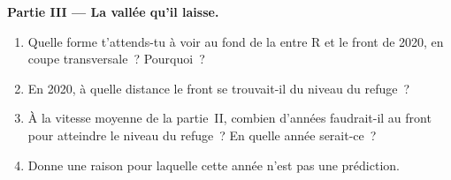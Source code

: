 \begin{problem}
\noindent\textbf{Partie III --- La vallée qu'il laisse.}\par\nopagebreak
\begin{enumerate}[resume, beginpenalty=10000]
  \item Quelle forme t'attends-tu à voir au fond de la  entre R et
        le front de 2020, en coupe transversale~? Pourquoi~?
  \item En 2020, à quelle distance le front se trouvait-il du niveau du
        refuge~?
  \item À la vitesse moyenne de la partie~II, combien d'années faudrait-il
        au front pour atteindre le niveau du refuge~? En quelle année
        serait-ce~?
  \item Donne une raison pour laquelle cette année n'est pas une prédiction.
\end{enumerate}
\end{problem}
